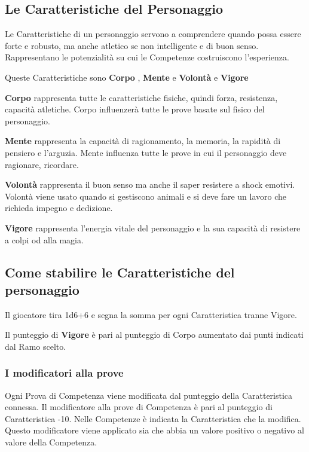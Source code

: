 \documentclass[12pt,a4paper,twoside,openany]{book}
\begin{document}
\begin{multicols}{2}

\subsection{Le Caratteristiche del Personaggio}

Le Caratteristiche di un personaggio servono a comprendere quando possa essere forte e robusto, ma anche atletico se non intelligente e di buon senso. Rappresentano le potenzialità su cui le Competenze costruiscono l'esperienza.

Queste Caratteristiche sono \textbf{Corpo} , \textbf{Mente}  e \textbf{Volontà}  e \textbf{Vigore}

\textbf{Corpo} rappresenta tutte le caratteristiche fisiche, quindi forza, resistenza, capacità atletiche. Corpo influenzerà tutte le prove basate sul fisico del personaggio.

\textbf{Mente} rappresenta la capacità di ragionamento, la memoria, la rapidità di pensiero e l'arguzia. Mente influenza tutte le prove in cui il personaggio deve ragionare, ricordare.

\textbf{Volontà} rappresenta il buon senso ma anche il saper resistere a shock emotivi. Volontà viene usato quando si gestiscono animali e si deve fare un lavoro che richieda impegno e dedizione.

\textbf{Vigore} rappresenta l'energia vitale del personaggio e la sua capacità di resistere a colpi od alla magia.

\subsection{Come stabilire le Caratteristiche del personaggio}

Il giocatore tira 1d6+6 e segna la somma per ogni Caratteristica tranne Vigore.

Il punteggio di \textbf{Vigore} è pari al punteggio di Corpo aumentato dai punti indicati dal Ramo scelto.

\subsubsection{I modificatori alla prove}

Ogni Prova di Competenza viene modificata dal punteggio della Caratteristica connessa. 
Il modificatore alla prove di Competenza è pari al punteggio di Caratteristica -10. Nelle Competenze è indicata la Caratteristica che la modifica. Questo modificatore viene applicato sia che abbia un valore positivo o negativo al valore della Competenza.

\end{multicols}
\end{document}
